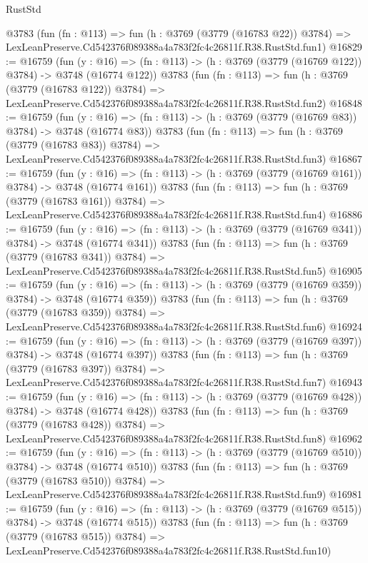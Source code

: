 \begin{lexlean}{RustStd}
\begin{coremodule}
    @3783
    (fun (fn : @113) =>
    fun (h : @3769 (@3779 (@16783 @22)) @3784) =>
    LexLeanPreserve.Cd542376f089388a4a783f2fc4c26811f.R38.RustStd.fun1)
@16829 := @16759
    (fun (y : @16) => (fn : @113) -> (h : @3769 (@3779 (@16769 @122)) @3784) -> @3748 (@16774 @122))
    @3783
    (fun (fn : @113) =>
    fun (h : @3769 (@3779 (@16783 @122)) @3784) =>
    LexLeanPreserve.Cd542376f089388a4a783f2fc4c26811f.R38.RustStd.fun2)
@16848 := @16759
    (fun (y : @16) => (fn : @113) -> (h : @3769 (@3779 (@16769 @83)) @3784) -> @3748 (@16774 @83))
    @3783
    (fun (fn : @113) =>
    fun (h : @3769 (@3779 (@16783 @83)) @3784) =>
    LexLeanPreserve.Cd542376f089388a4a783f2fc4c26811f.R38.RustStd.fun3)
@16867 := @16759
    (fun (y : @16) => (fn : @113) -> (h : @3769 (@3779 (@16769 @161)) @3784) -> @3748 (@16774 @161))
    @3783
    (fun (fn : @113) =>
    fun (h : @3769 (@3779 (@16783 @161)) @3784) =>
    LexLeanPreserve.Cd542376f089388a4a783f2fc4c26811f.R38.RustStd.fun4)
@16886 := @16759
    (fun (y : @16) => (fn : @113) -> (h : @3769 (@3779 (@16769 @341)) @3784) -> @3748 (@16774 @341))
    @3783
    (fun (fn : @113) =>
    fun (h : @3769 (@3779 (@16783 @341)) @3784) =>
    LexLeanPreserve.Cd542376f089388a4a783f2fc4c26811f.R38.RustStd.fun5)
@16905 := @16759
    (fun (y : @16) => (fn : @113) -> (h : @3769 (@3779 (@16769 @359)) @3784) -> @3748 (@16774 @359))
    @3783
    (fun (fn : @113) =>
    fun (h : @3769 (@3779 (@16783 @359)) @3784) =>
    LexLeanPreserve.Cd542376f089388a4a783f2fc4c26811f.R38.RustStd.fun6)
@16924 := @16759
    (fun (y : @16) => (fn : @113) -> (h : @3769 (@3779 (@16769 @397)) @3784) -> @3748 (@16774 @397))
    @3783
    (fun (fn : @113) =>
    fun (h : @3769 (@3779 (@16783 @397)) @3784) =>
    LexLeanPreserve.Cd542376f089388a4a783f2fc4c26811f.R38.RustStd.fun7)
@16943 := @16759
    (fun (y : @16) => (fn : @113) -> (h : @3769 (@3779 (@16769 @428)) @3784) -> @3748 (@16774 @428))
    @3783
    (fun (fn : @113) =>
    fun (h : @3769 (@3779 (@16783 @428)) @3784) =>
    LexLeanPreserve.Cd542376f089388a4a783f2fc4c26811f.R38.RustStd.fun8)
@16962 := @16759
    (fun (y : @16) => (fn : @113) -> (h : @3769 (@3779 (@16769 @510)) @3784) -> @3748 (@16774 @510))
    @3783
    (fun (fn : @113) =>
    fun (h : @3769 (@3779 (@16783 @510)) @3784) =>
    LexLeanPreserve.Cd542376f089388a4a783f2fc4c26811f.R38.RustStd.fun9)
@16981 := @16759
    (fun (y : @16) => (fn : @113) -> (h : @3769 (@3779 (@16769 @515)) @3784) -> @3748 (@16774 @515))
    @3783
    (fun (fn : @113) =>
    fun (h : @3769 (@3779 (@16783 @515)) @3784) =>
    LexLeanPreserve.Cd542376f089388a4a783f2fc4c26811f.R38.RustStd.fun10)

\end{coremodule}
\end{lexlean}
